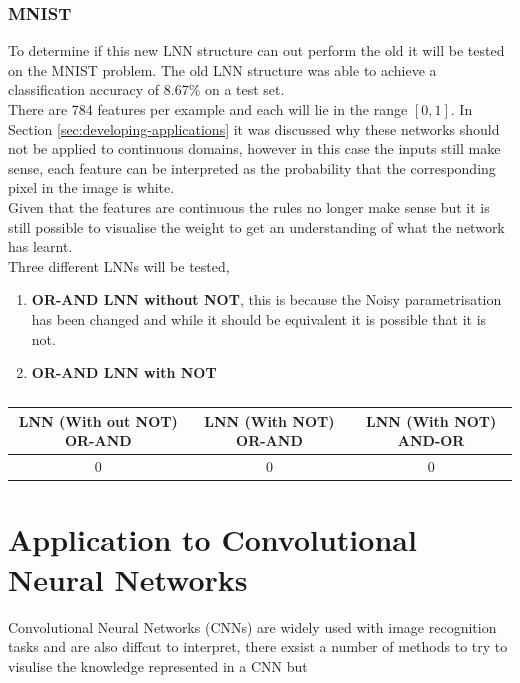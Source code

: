 \subsection{MNIST}
To determine if this new LNN structure can out perform the old it will be tested on the MNIST problem. The old LNN structure was able to achieve a classification accuracy of 8.67\% on a test set.\\

There are 784 features per example and each will lie in the range $[0, 1]$. In Section \ref{sec:developing-applications} it was discussed why these networks should not be applied to continuous domains, however in this case the inputs still make sense, each feature can be interpreted as the probability that the corresponding pixel in the image is white.\\

Given that the features are continuous the rules no longer make sense but it is still possible to visualise the weight to get an understanding of what the network has learnt.\\

Three different LNNs will be tested,

\begin{enumerate}
	\item \textbf{OR-AND LNN without NOT}, this is because the Noisy parametrisation has been changed and while it should be equivalent it is possible that it is not.
	
	\item \textbf{OR-AND LNN with NOT}
\end{enumerate}

\begin{table}[H]
	\begin{center}
		\begin{tabular}{| c | c | c |}
			\hline
			LNN (With out NOT) OR-AND & LNN (With NOT) OR-AND & LNN (With NOT) AND-OR \\
			\hline
			\hline
			0 & 0 & 0 \\
			\hline
		\end{tabular}
	\end{center}
	\caption{}
	\label{tab:lnn-peformance-comparason}
\end{table}

\chapter{Application to Convolutional Neural Networks}
Convolutional Neural Networks (CNNs) are widely used with image recognition tasks and are also diffcut to interpret, there exsist a number of methods to try to visulise the knowledge represented in a CNN but 